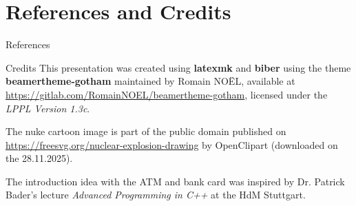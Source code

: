 \section{References and Credits}

\begin{frame}[allowframebreaks]{References}
	\printbibliography[heading=none]
\end{frame}

\begin{frame}[allowframebreaks]{Credits}
	\footnotesize
	This presentation was created using \textbf{latexmk} and \textbf{biber} using the theme \textbf{beamertheme-gotham} maintained by Romain NOËL,
	available at \url{https://gitlab.com/RomainNOEL/beamertheme-gotham},
	licensed under the \textit{LPPL Version 1.3c}.

	The nuke cartoon image is part of the public domain published on \url{https://freesvg.org/nuclear-explosion-drawing} by OpenClipart (downloaded on the 28.11.2025).

	The introduction idea with the ATM and bank card was inspired by Dr. Patrick Bader's lecture \textit{Advanced Programming in C++} at the HdM Stuttgart.
\end{frame}